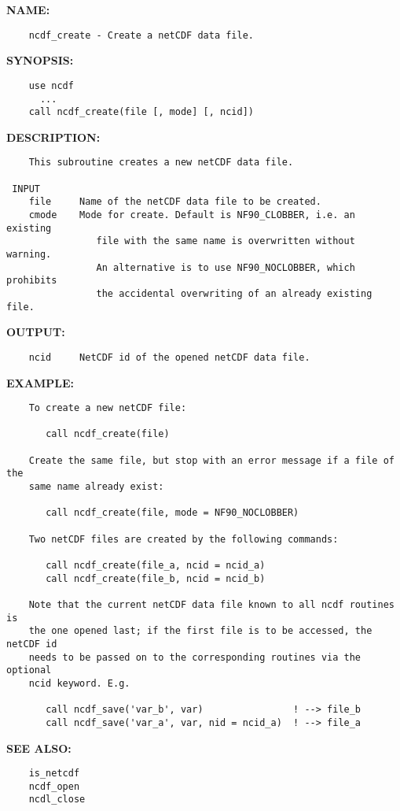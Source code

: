 \label{ch:robo60}
\label{ch:Files_ncdf_create}
\textbf{NAME:}\hspace{0.08in}\begin{Verbatim}
    ncdf_create - Create a netCDF data file.
\end{Verbatim}
\textbf{SYNOPSIS:}\hspace{0.08in}\begin{Verbatim}
    use ncdf
      ...
    call ncdf_create(file [, mode] [, ncid])
\end{Verbatim}
\textbf{DESCRIPTION:}\hspace{0.08in}\begin{Verbatim}
    This subroutine creates a new netCDF data file.

 INPUT
    file     Name of the netCDF data file to be created.
    cmode    Mode for create. Default is NF90_CLOBBER, i.e. an existing
                file with the same name is overwritten without warning.
                An alternative is to use NF90_NOCLOBBER, which prohibits
                the accidental overwriting of an already existing file.
\end{Verbatim}
\textbf{OUTPUT:}\hspace{0.08in}\begin{Verbatim}
    ncid     NetCDF id of the opened netCDF data file.
\end{Verbatim}
\textbf{EXAMPLE:}\hspace{0.08in}\begin{Verbatim}
    To create a new netCDF file:

       call ncdf_create(file)

    Create the same file, but stop with an error message if a file of the
    same name already exist:

       call ncdf_create(file, mode = NF90_NOCLOBBER)

    Two netCDF files are created by the following commands:

       call ncdf_create(file_a, ncid = ncid_a)
       call ncdf_create(file_b, ncid = ncid_b)

    Note that the current netCDF data file known to all ncdf routines is
    the one opened last; if the first file is to be accessed, the netCDF id
    needs to be passed on to the corresponding routines via the optional
    ncid keyword. E.g.

       call ncdf_save('var_b', var)                ! --> file_b
       call ncdf_save('var_a', var, nid = ncid_a)  ! --> file_a
\end{Verbatim}
\textbf{SEE ALSO:}\hspace{0.08in}\begin{Verbatim}
    is_netcdf
    ncdf_open
    ncdl_close
\end{Verbatim}
